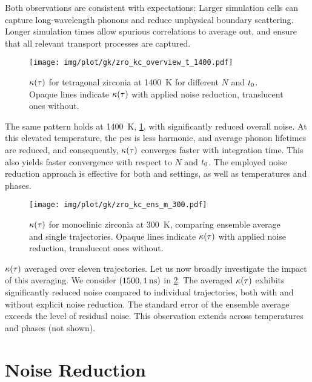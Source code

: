 Both observations are consistent with expectations: Larger simulation cells can capture long-wavelength phonons and reduce unphysical boundary scattering. Longer simulation times allow spurious correlations to average out, and ensure that all relevant transport processes are captured.
\begin{figure}
  \texttt{[image: img/plot/gk/zro\_kc\_overview\_t\_1400.pdf]}
  \caption{
  $\kappa(\tau)$ for tetragonal zirconia at \qty{1400}{K} for different $N$ and $t_0$.
  Opaque lines indicate $\kappa(\tau)$ with applied noise reduction, translucent ones without.
  }
  \label{fig:gkc_overview_t_1400}
\end{figure}
The same pattern holds at \qty{1400}{K}, \cref{fig:gkc_overview_t_1400}, with significantly reduced overall noise. At this elevated temperature, the \gls{pes} is less harmonic, and average phonon lifetimes are reduced, and consequently, $\kappa(\tau)$ converges faster with integration time.
This also yields faster convergence with respect to $N$ and $t_0$.
The employed noise reduction approach is effective for both  and  settings, as well as temperatures and phases.

\begin{figure}
  \texttt{[image: img/plot/gk/zro\_kc\_ens\_m\_300.pdf]}
  \caption{
  $\kappa(\tau)$ for monoclinic zirconia at \qty{300}{K}, comparing ensemble average and single trajectories.
  Opaque lines indicate $\kappa(\tau)$ with applied noise reduction, translucent ones without.
  }
  \label{fig:gkc_ens_m_300}
\end{figure}

{} $\kappa(\tau)$ averaged over eleven trajectories. Let us now broadly investigate the impact of this averaging. We consider $(1500, \qty{1}{ns})$ in \cref{fig:gkc_ens_m_300}.
The averaged $\kappa(\tau)$ exhibits significantly reduced noise compared to individual trajectories, both with and without explicit noise reduction.
The standard error of the ensemble average exceeds the level of residual noise.
This observation extends across temperatures and phases (not shown).

\section{Noise Reduction}
\label{sec:gkc_noise}

